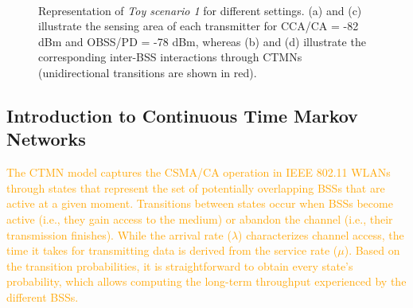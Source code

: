 \documentclass{ieeeaccess}
\begin{document}
\begin{figure}[h!]
	\centering
	\hspace{1cm}
	\\
	\hspace{1cm}
	\caption{Representation of \emph{Toy scenario 1} for different settings. (a) and (c) illustrate the sensing area of each transmitter for CCA/CA = -82 dBm and OBSS/PD = -78 dBm, whereas (b) and (d) illustrate the corresponding inter-BSS interactions through CTMNs (unidirectional transitions are shown in red).}
	\label{fig:toy_scenario_1b}
\end{figure}

\subsection{Introduction to Continuous Time Markov Networks}
\textcolor{orange}{The CTMN model captures the CSMA/CA operation in IEEE 802.11 WLANs through states that represent the set of potentially overlapping BSSs that are active at a given moment. Transitions between states occur when BSSs become active (i.e., they gain access to the medium) or abandon the channel (i.e., their transmission finishes). While the arrival rate ($\lambda$) characterizes channel access, the time it takes for transmitting data is derived from the service rate ($\mu$). Based on the transition probabilities, it is straightforward to obtain every state's probability, which allows computing the long-term throughput experienced by the different BSSs.}
\end{document}
